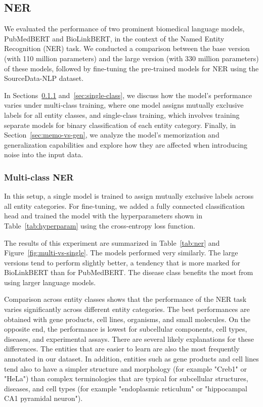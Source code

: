 \documentclass{bioinfo}
\begin{document}
\subsection{NER}\label{sec:results-ner}

We evaluated the performance of two prominent biomedical language models, PubMedBERT and BioLinkBERT, in the context of the Named Entity Recognition (NER) task. We conducted a comparison between the base version (with 110 million parameters) and the large version (with 330 million parameters) of these models, followed by fine-tuning the pre-trained models for NER using the SourceData-NLP dataset.

In Sections~\ref{sec:multi-class} and~\ref{sec:single-class}, we discuss how the model's performance varies under multi-class training, where one model assigns mutually exclusive labels for all entity classes, and single-class training, which involves training separate models for binary classification of each entity category. Finally, in Section~\ref{sec:memo-vs-gen}, we analyze the model's memorization and generalization capabilities and explore how they are affected when introducing noise into the input data.

\subsubsection{Multi-class NER}\label{sec:multi-class}

In this setup, a single model is trained to assign mutually exclusive labels across all entity categories. For fine-tuning, we added a fully connected classification head and trained the model with the hyperparameters shown in Table~\ref{tab:hyperparam} using the cross-entropy loss function.

The results of this experiment are summarized in Table~\ref{tab:ner} and Figure~\ref{fig:multi-vs-single}. The models performed very similarly. The large versions tend to perform slightly better, a tendency that is more marked for BioLinkBERT than for PubMedBERT. The disease class benefits the most from using larger language models.

Comparison across entity classes shows that the performance of the NER task varies significantly across different entity categories. The best performances are obtained with gene products, cell lines, organisms, and small molecules. On the opposite end, the performance is lowest for subcellular components, cell types, diseases, and experimental assays. There are several likely explanations for these differences. The entities that are easier to learn are also the most frequently annotated in our dataset. In addition, entities such as gene products and cell lines tend also to have a simpler structure and morphology (for example "Creb1" or "HeLa") than complex terminologies that are typical for subcellular structures, diseases, and cell types (for example "endoplasmic reticulum" or "hippocampal CA1 pyramidal neuron"). 
\end{document}
